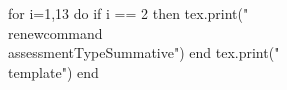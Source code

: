 \documentclass[twoside, 10pt]{article}
\title{}
\date{}
\newcommand{\assessmentType}{Formative}
\newcommand{\template}{
\directlua{tex.print(utils.genVersion())}
\noindent
{\large
First Name \rule{6em}{.1pt}\hspace{\stretch{1}} Last Name \rule{6em}{.1pt}\hspace{\stretch{1}} Date \rule{1.5em}{.1pt} -- \rule{1.5em}{.1pt} -- \rule{1.5em}{.1pt}\hspace{\stretch{1}} Period \rule{2em}{.1pt}\hspace{\stretch{1}} Score \rule{2em}{.1pt}
}
\vspace{1em}

\noindent
\renewcommand{\arraystretch}{2}
\begin{tabular}{|l|l|l|}
\hline
\textbf{ARGUE}&\textbf{MODEL}&\textbf{BE PRECISE}\\
\hline
&&\\
\hline
\end{tabular}

\begin{enumerate}
\section*{BE PRECISE}
\item Complete the properties of logarithms.
\begin{enumerate}[itemsep=2em]
\item
$\log_b(\frac{U}{V}) = \rule{8em}{0.4pt}$
\item
$\log_b(U^c) =  \rule{8em}{0.4pt}$
\item
$\displaystyle \log_b(a) = \frac{\log_c(\rule{3em}{0.4pt})}{\log_c( \rule{3em}{0.4pt})}$
\end{enumerate}
\item Find the value of each of the following expressions.
\begin{enumerate}[itemsep=2em]
\item \directlua{b=utils.genRandom(2, 5);}$\log_{\directlua{tex.print(b)}}({\directlua{tex.print(b)}}^{\directlua{tex.print(utils.genRandom(-30, 30))}}) =  \rule{4em}{0.4pt}$
\item  \directlua{b=utils.genRandom(2, 5); e=utils.genRandom(2,3)}$\log_{\directlua{tex.print(b)}}({\directlua{tex.print(math.tointeger(b^e))}}) =\rule{4em}{0.4pt}$
\item  \directlua{b=utils.genRandom(2, 5)}$\log_{\directlua{tex.print(b)}}(\sqrt[\directlua{tex.print(utils.genRandom(1, 15, false, true, 2))}]{{\directlua{tex.print(b)}}}) = \rule{4em}{0.4pt}$
\item  \directlua{b=utils.genRandom(2, 5); e=utils.genRandom(2,3)} $\log_{\directlua{tex.print(b)}}\left(\frac{1}{{\directlua{tex.print(math.tointeger(b^e))}}}\right) = \rule{4em}{0.4pt}$
\end{enumerate}
\section*{ARGUE}
\item 
Complete the steps of a proof for the logarithm product rule: $\displaystyle \log_b\left(U\cdot V\right) = \log_b{U} + \log_b{V}$. Start with two equations:
\[
b^x = U\hspace{8em}b^y = V
\]
\begin{enumerate}[label = (\roman*)]
\item
Rewrite both of these equations as logarithms.
\begin{align*}
\log_{\rule{2em}{.4pt}}\left(\rule{3em}{0.4pt}\right) &= \rule{4em}{.4pt}\\[1em]
\log_{\rule{2em}{.4pt}}\left(\rule{3em}{0.4pt}\right) &= \rule{4em}{.4pt}
\end{align*}
\item Multiply the left sides of the original equations, and set the product equal to the product of
the right sides of the original equations.
\[
\rule{6em}{0.4pt} = U\cdot V
\]
\item Combine the exponents on the left side of the equation so that it is written with a
single base.
\[
\rule{6em}{0.4pt} = U\cdot V
\]
\item Rewrite the last equation as a logarithm.
\[
\log_{\rule{2em}{.4pt}}\left(\rule{3em}{0.4pt}\right) = \rule{4em}{.4pt}
\]
\item Combine the result in (i) and (iv) to derive the product rule of logarithms:\\[1em]
\begin{center}
\rule{20em}{.4pt}
\end{center}
\end{enumerate}
\clearpage

\item \directlua{a = utils.genRandom(-5,5); b = utils.genRandom(-5,5, false, false, -a);} Solve $x^2\directlua{tex.print(utils.normalizeCoeff(a+b, true))}x\directlua{tex.print(utils.normalizeCoeff(a*b, true))} =0$ for $x$. Show all your work!
\begin{enumerate}[label = \textbf{Step \arabic*:}, leftmargin=*]
\item
Find two numbers $u$ and $v$ such that $u\cdot v = \directlua{tex.print(utils.normalizeCoeff(a*b, true))}$ and $u + v =  \directlua{tex.print(utils.normalizeCoeff(a+b, true))}$
\vspace{\stretch{1}}
\item Use the result in Step 1 to factor the polynomial of the left.
\vspace{\stretch{1}}
\item Use the factorization in Step 2 to determine the solutions of the equations.
\vspace{\stretch{1}}
\end{enumerate}


\item \directlua{a=(utils.genRandom(-5,5,true, false, true)); b=utils.genRandom(-5,5,true, false, tonumber(a)); c=utils.genRandom(-5,5,false, false, false)} Solve $\log_2(x\directlua{tex.print(a)}) - \log_2(x\directlua{tex.print(b)}) = \directlua{tex.print(c)}$ for $x$.
\begin{enumerate}[label = \textbf{Step \arabic*:}, leftmargin=*]
\item
Combine each side into a single logarithm with the same base.
\vspace{\stretch{1}}
\item
Exponentiate both sides with the appropriate base.
\vspace{\stretch{1}}
\item
Solve the resulted simplified equation.
\vspace{\stretch{1}}
\item Check for extraneous solutions. Note that the input of the log cannot be $0$ or negative as well.
\vspace{\stretch{1}}
\end{enumerate}
\clearpage
\end{enumerate}
}
\begin{document}
\begin{luacode}
for i=1,13 do
	if i == 2 then
		tex.print("\\renewcommand{\\assessmentType}{Summative}")
	end
	tex.print("\\template")	
end
\end{luacode}
\end{document}
